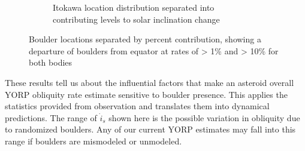 \begin{figure}[H]
\begin{subfigure}{0.49\textwidth}
        \caption{Itokawa location distribution separated into contributing levels to solar inclination change}
    \end{subfigure}  
    \caption{Boulder locations separated by percent contribution, showing a departure of boulders from equator at rates of > 1\% and > 10\% for both bodies}
    \label{fig:location_percents}
\end{figure}

These results tell us about the influential factors that make an asteroid overall YORP obliquity rate estimate sensitive to boulder presence. This applies the statistics provided from observation and translates them into dynamical predictions. The range of $\dot{\mathit{i}}_s$ shown here is the possible variation in obliquity due to randomized boulders. Any of our current YORP estimates may fall into this range if boulders are mismodeled or unmodeled.






